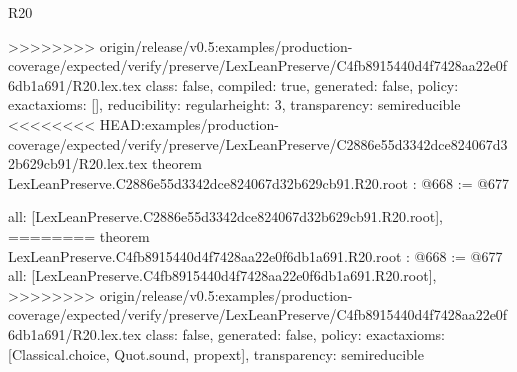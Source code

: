 \begin{lexlean}{R20}
\begin{coremodule}
{{{{{{{{{{{>>>>>>>> origin/release/v0.5:examples/production-coverage/expected/verify/preserve/LexLeanPreserve/C4fb8915440d4f7428aa22e0f6db1a691/R20.lex.tex
  class: false,
  compiled: true,
  generated: false,
  policy: exact{axioms: []},
  reducibility: regular{height: 3},
  transparency: semireducible
}
<<<<<<<< HEAD:examples/production-coverage/expected/verify/preserve/LexLeanPreserve/C2886e55d3342dce824067d32b629cb91/R20.lex.tex
theorem LexLeanPreserve.C2886e55d3342dce824067d32b629cb91.R20.root : @668 := @677 {
  all: [LexLeanPreserve.C2886e55d3342dce824067d32b629cb91.R20.root],
========
theorem LexLeanPreserve.C4fb8915440d4f7428aa22e0f6db1a691.R20.root : @668 := @677 {
  all: [LexLeanPreserve.C4fb8915440d4f7428aa22e0f6db1a691.R20.root],
>>>>>>>> origin/release/v0.5:examples/production-coverage/expected/verify/preserve/LexLeanPreserve/C4fb8915440d4f7428aa22e0f6db1a691/R20.lex.tex
  class: false,
  generated: false,
  policy: exact{axioms: [Classical.choice, Quot.sound, propext]},
  transparency: semireducible
}

}}}}}}}}}}}
\end{coremodule}
\end{lexlean}
